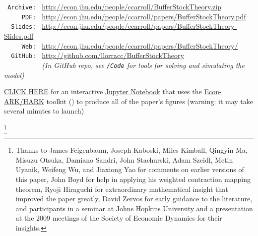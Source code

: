 \documentclass[titlepage]{\econtex}\providecommand{\texname}{BufferStockTheory}
\begin{document}
\begin{small}
\parbox{\textwidth}{
\begin{center}
\begin{tabbing}
\texttt{~Archive:~} \= \= \url{http://econ.jhu.edu/people/ccarroll/BufferStockTheory.zip} \kill \\  %
\texttt{~~~~~PDF:~} \> \> \url{http://econ.jhu.edu/people/ccarroll/papers/BufferStockTheory.pdf} \\
\texttt{~~Slides:~} \> \> \url{http://econ.jhu.edu/people/ccarroll/papers/BufferStockTheory-Slides.pdf} \\
\texttt{~~~~~Web:~} \> \> \url{http://econ.jhu.edu/people/ccarroll/papers/BufferStockTheory/}    \\
\texttt{~~GitHub:~} \> \> \url{http://github.com/llorracc/BufferStockTheory} \\
\texttt{~~~~~~~~~~} \> \> \textit{(In GitHub repo, see \texttt{/Code} for tools for solving and simulating the model)} \\
\end{tabbing}
\end{center}
          
\href{https://colab.research.google.com/github/econ-ark/REMARK/blob/master/REMARKs/BufferStockTheory/BufferStockTheory.ipynb}{CLICK HERE} for an interactive \href{http:https://en.wikipedia.org/wiki/Project_Jupyter}{Jupyter Notebook} that uses the \href{https://econ-ark/HARK}{Econ-ARK/HARK} toolkit (\cite{carroll_et_al-proc-scipy-2018}) to produce all of the paper's figures (warning: it may take several minutes to launch)
}
\end{small}

\begin{authorsinfo}
\end{authorsinfo}

\thanks{Thanks to James Feigenbaum, Joseph Kaboski, Miles
  Kimball, Qingyin Ma, Misuzu Otsuka, Damiano Sandri, John Stachurski, Adam Szeidl, Metin Uyanik, Weifeng Wu,
  and Jiaxiong Yao for comments on earlier versions of this paper, John Boyd for help
  in applying his weighted contraction mapping theorem, Ryoji
  Hiraguchi for extraordinary mathematical insight that improved the
  paper greatly, David Zervos for early guidance to the literature,
  and participants in a seminar at Johns Hopkins University and a
  presentation at the 2009 meetings of the Society of Economic
  Dynamics for their insights.}
\end{document}
